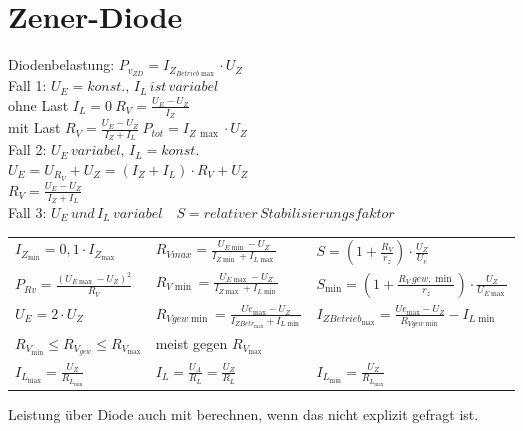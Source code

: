     \section{Zener-Diode}\label{sec:zener-diode}
    Diodenbelastung: $P_{v_{ZD}}=I_{Z_{Betrieb\max}}\cdot U_Z$\\
    Fall 1: $U_E=konst.,\, I_L\, ist\, variabel$\\
    \hspace*{1cm} ohne Last $I_L=0\: R_V=\frac{U_E-U_Z}{I_Z}$\\
    \hspace*{1cm} mit Last $R_V=\frac{U_E-U_Z}{I_Z+I_L}\: P_{tot}=I_{Z\, \max}\cdot U_Z$\\
    Fall 2: $U_E\, variabel,\, I_L=konst.$\\
    \hspace*{1cm} $U_E=U_{R_V}+U_Z=(I_Z+I_L)\cdot R_V+U_Z$\\
    \hspace*{1cm} $R_V=\frac{U_E-U_Z}{I_Z+I_L}$\\
    Fall 3: $U_E\, und\, I_L\, variabel\quad S=relativer\, Stabilisierungsfaktor$
    \begin{table}[H]
        \renewcommand{\arraystretch}{1.2}
        \begin{tabularx}{\columnwidth}{l l l}
            $I_{Z_{\min}}=0,1\cdot I_{Z_{\max}}$ & $R_{Vmax}=\frac{U_{E\min}-U_Z}{I_{Z\min}+I_{L\max}}$ & $S=(1+\frac{R_V}{r_z})\cdot\frac{U_Z}{U_e}$\\
            $P_{Rv}=\frac{(U_{E\max}-U_Z)^2}{R_V}$ & $R_{V\min}=\frac{U_{E\max}-U_Z}{I_{Z\max}+I_{L\min}}$ & $S_{\min}=(1+\frac{R_V\,gew.\,\min}{r_z})\cdot\frac{U_Z}{U_{E\max}}$\\
            $U_E=2\cdot U_Z$ & $R_{Vgew\min}=\frac{U{e_{\max}}-U_Z}{I_{ZBetr_{\max}}+I_{L\min}}$ & $I_{Z{Betrieb_{\max}}}=\frac{U{e_{\max}}-U_Z}{R_{Vgew\min}}-I_{L\min}$\\
            $R_{V_{\min}}\leq R_{V_{gew}} \leq R_{V_{\max}}$ & meist gegen $R_{V_{\max}}$ & \\
            $I_{L_{\max}}=\frac{U_Z}{R_{L_{\min}}}$ & $I_L=\frac{U_A}{R_L}=\frac{U_Z}{R_L}$ & $I_{L_{\min}}=\frac{U_Z}{R_{L_{\max}}}$ \\
        \end{tabularx}
    \end{table}
    Leistung über Diode auch mit berechnen, wenn das nicht explizit gefragt ist.\\
    

